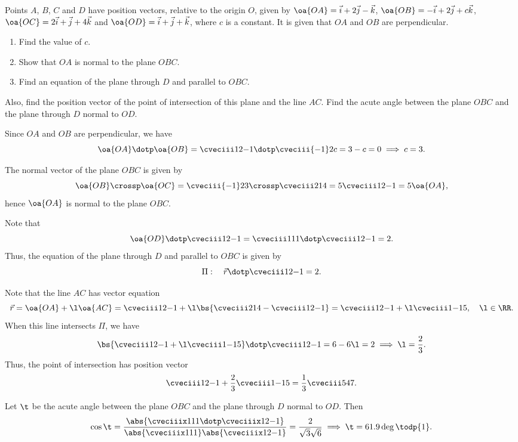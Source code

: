 \begin{problem}
    Points $A$, $B$, $C$ and $D$ have position vectors, relative to the origin $O$, given by $\oa{OA} = \vec i + 2\vec j - \vec k$, $\oa{OB} = -\vec i + 2\vec j + c\vec k$, $\oa{OC} = 2\vec i + \vec j + 4 \vec k$ and $\oa{OD} = \vec i + \vec j + \vec k$, where $c$ is a constant. It is given that $OA$ and $OB$ are perpendicular.

    \begin{enumerate}
        \item Find the value of $c$.
        \item Show that $OA$ is normal to the plane $OBC$.
        \item Find an equation of the plane through $D$ and parallel to $OBC$.
    \end{enumerate}

    Also, find the position vector of the point of intersection of this plane and the line $AC$. Find the acute angle between the plane $OBC$ and the plane through $D$ normal to $OD$.
\end{problem}
\begin{solution}
    \begin{ppart}
        Since $OA$ and $OB$ are perpendicular, we have \[\oa{OA} \dotp \oa{OB} = \cveciii12{-1} \dotp \cveciii{-1}2c = 3 - c = 0 \implies c = 3.\]
    \end{ppart}
    \begin{ppart}
        The normal vector of the plane $OBC$ is given by \[\oa{OB} \crossp \oa{OC} = \cveciii{-1}23 \crossp \cveciii214 = 5\cveciii1{2}{-1} = 5\oa{OA},\] hence $\oa{OA}$ is normal to the plane $OBC$.
    \end{ppart}
    \begin{ppart}
        Note that \[\oa{OD} \dotp \cveciii12{-1} = \cveciii111 \dotp \cveciii12{-1} = 2.\] Thus, the equation of the plane through $D$ and parallel to $OBC$ is given by \[\Pi: \quad \vec r \dotp \cveciii12{-1} = 2.\]
    \end{ppart}

    Note that the line $AC$ has vector equation \[\vec r = \oa{OA} + \l \oa{AC} = \cveciii12{-1} + \l \bs{\cveciii214 - \cveciii12{-1}} = \cveciii12{-1} + \l \cveciii1{-1}5, \quad \l \in \RR.\] When this line intersects $\Pi$, we have \[\bs{\cveciii12{-1} + \l \cveciii1{-1}5} \dotp \cveciii1{2}{-1} = 6 - 6\l = 2 \implies \l = \frac23.\] Thus, the point of intersection has position vector \[\cveciii12{-1} + \frac23 \cveciii1{-1}5 = \frac13 \cveciii547.\]
    
    Let $\t$ be the acute angle between the plane $OBC$ and the plane through $D$ normal to $OD$. Then \[\cos \t = \frac{\abs{\cveciiix111 \dotp \cveciiix12{-1}}}{\abs{\cveciiix111} \abs{\cveciiix12{-1}}} = \frac2{\sqrt{3} \sqrt{6}} \implies \t = 61.9 \deg \todp{1}.\]
\end{solution}


